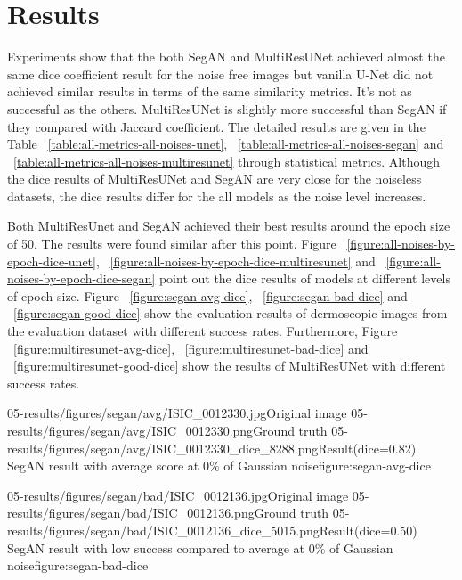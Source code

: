 \chapter{Results}
\thispagestyle{empty}

    Experiments show that the both SegAN and MultiResUNet achieved almost the same dice coefficient result for the noise free images
    but vanilla U-Net did not achieved similar results in terms of the same similarity metrics. It's not as successful as the others.
    MultiResUNet is slightly more successful than SegAN if they compared with Jaccard coefficient.
    The detailed results are given in the Table ~\ref{table:all-metrics-all-noises-unet}, ~\ref{table:all-metrics-all-noises-segan} and ~\ref{table:all-metrics-all-noises-multiresunet} through statistical metrics.
    Although the dice results of MultiResUNet and SegAN are very close for the noiseless datasets, the dice results differ for the all models as the noise level increases.

    Both MultiResUnet and SegAN achieved their best results around the epoch size of 50. The results were found similar after this point.
    Figure ~\ref{figure:all-noises-by-epoch-dice-unet}, ~\ref{figure:all-noises-by-epoch-dice-multiresunet} and ~\ref{figure:all-noises-by-epoch-dice-segan} point out the dice results of models at different levels of epoch size.
    Figure ~\ref{figure:segan-avg-dice}, ~\ref{figure:segan-bad-dice} and ~\ref{figure:segan-good-dice} show the evaluation results of dermoscopic images from the evaluation dataset with different success rates.
    Furthermore, Figure ~\ref{figure:multiresunet-avg-dice}, ~\ref{figure:multiresunet-bad-dice} and ~\ref{figure:multiresunet-good-dice} show the results of MultiResUNet with different success rates.

    \sidebyside
        {05-results/figures/segan/avg/ISIC_0012330.jpg}{Original image}
        {05-results/figures/segan/avg/ISIC_0012330.png}{Ground truth}
        {05-results/figures/segan/avg/ISIC_0012330_dice_8288.png}{Result(dice=0.82)}
        {SegAN result with average score at 0\% of Gaussian noise}{figure:segan-avg-dice}

    \sidebyside
        {05-results/figures/segan/bad/ISIC_0012136.jpg}{Original image}
        {05-results/figures/segan/bad/ISIC_0012136.png}{Ground truth}
        {05-results/figures/segan/bad/ISIC_0012136_dice_5015.png}{Result(dice=0.50)}
        {SegAN result with low success compared to average at 0\% of Gaussian noise}{figure:segan-bad-dice}

